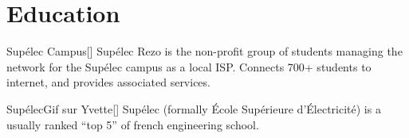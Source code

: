 \documentclass[12pt,a4paper]{moderncv}
\begin{document}





\section{Education}

        {Supélec Campus}{}{[]}
{Supélec Rezo is the non-profit group of students managing the network
  for the Supélec campus as a local ISP. Connects 700+ students to internet, and
  provides associated services.}

        {Supélec}{Gif sur Yvette}{[]}
{Supélec (formally École Supérieure d'Électricité) is a usually
  ranked ``top 5'' of french engineering school.}


\end{document}
